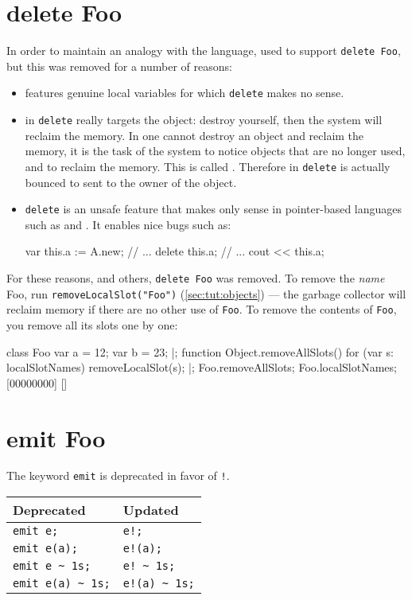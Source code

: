 \section{delete Foo}
\label{sec:k1:delete}
In order to maintain an analogy with the \Cxx language, \us used to
support \lstinline{delete Foo}, but this was removed for a number of
reasons:
\begin{itemize}
\item {} features genuine local variables for which
  \lstinline{delete} makes no sense.
\item in \Cxx \lstinline{delete} really targets the object: destroy
  yourself, then the system will reclaim the memory.  In \us one cannot
  destroy an object and reclaim the memory, it is the task of the system to
  notice objects that are no longer used, and to reclaim the memory.  This
  is called .  Therefore in \us \lstinline{delete}
  is actually bounced to  sent to the owner
  of the object.
\item \lstinline{delete} is an unsafe feature that makes only sense in
  pointer-based languages such as \langC and \Cxx.  It enables nice bugs
  such as:
\begin{urbiunchecked}
var this.a := A.new;
// ...
delete this.a;
// ...
cout << this.a;
\end{urbiunchecked}
\end{itemize}

For these reasons, and others, \lstinline{delete Foo} was removed.  To
remove the \emph{name} Foo, run {\lstinline{removeLocalSlot("Foo")}}
(\autoref{sec:tut:objects}) --- the garbage collector will reclaim memory if
there are no other use of \lstinline{Foo}.  To remove the contents of
\lstinline{Foo}, you remove all its slots one by one:

\begin{urbiscript}[firstnumber=1]
class Foo
{
  var a = 12;
  var b = 23;
}|;
function Object.removeAllSlots()
{
  for (var s: localSlotNames)
    removeLocalSlot(s);
}|;
Foo.removeAllSlots;
Foo.localSlotNames;
[00000000] []
\end{urbiscript}

\section{emit Foo}
\label{sec:k1:emit}
The keyword \lstinline{emit} is deprecated in favor of \lstinline{!}.

\begin{center}
  \begin{tabular}{|l|l|}
    \hline
    \textbf{Deprecated} & \textbf{Updated}  \\
    \hline
    \lstinline|emit e;|         & \lstinline|e!;|          \\
    \lstinline|emit e(a);|      & \lstinline|e!(a);|       \\
    \lstinline|emit e ~ 1s;|    & \lstinline|e! ~ 1s;|     \\
    \lstinline|emit e(a) ~ 1s;| & \lstinline|e!(a) ~ 1s;|  \\
    \hline
  \end{tabular}
\end{center}

